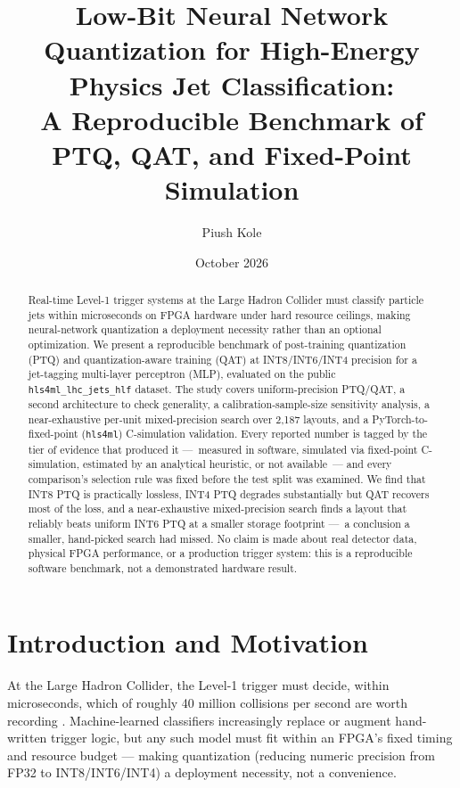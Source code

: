 \documentclass[11pt]{article}
\title{Low-Bit Neural Network Quantization for High-Energy Physics Jet Classification:\\
A Reproducible Benchmark of PTQ, QAT, and Fixed-Point Simulation}
\author{Piush Kole}
\date{October 2026}
\begin{document}
\maketitle

\begin{abstract}
Real-time Level-1 trigger systems at the Large Hadron Collider must classify particle jets within
microseconds on FPGA hardware under hard resource ceilings, making neural-network quantization a
deployment necessity rather than an optional optimization. We present a reproducible benchmark of
post-training quantization (PTQ) and quantization-aware training (QAT) at INT8/INT6/INT4 precision
for a jet-tagging multi-layer perceptron (MLP), evaluated on the public \texttt{hls4ml\_lhc\_jets\_hlf}
dataset. The study covers uniform-precision PTQ/QAT, a second architecture to check generality, a
calibration-sample-size sensitivity analysis, a near-exhaustive per-unit mixed-precision search over
2{,}187 layouts, and a PyTorch-to-fixed-point (\texttt{hls4ml}) C-simulation validation. Every
reported number is tagged by the tier of evidence that produced it ---~measured in software,
simulated via fixed-point C-simulation, estimated by an analytical heuristic, or not available~---
and every comparison's selection rule was fixed before the test split was examined. We find that
INT8 PTQ is practically lossless, INT4 PTQ degrades substantially but QAT recovers most of the loss,
and a near-exhaustive mixed-precision search finds a layout that reliably beats uniform INT6 PTQ at a
smaller storage footprint ---~a conclusion a smaller, hand-picked search had missed. No claim is made
about real detector data, physical FPGA performance, or a production trigger system: this is a
reproducible software benchmark, not a demonstrated hardware result.
\end{abstract}

\section{Introduction and Motivation}

At the Large Hadron Collider, the Level-1 trigger must decide, within microseconds, which of
roughly 40 million collisions per second are worth recording \citep{duarte2018fast}. Machine-learned
classifiers increasingly replace or augment hand-written trigger logic, but any such model must fit
within an FPGA's fixed timing and resource budget --- making quantization (reducing numeric precision
from FP32 to INT8/INT6/INT4) a deployment necessity, not a convenience.
\end{document}
